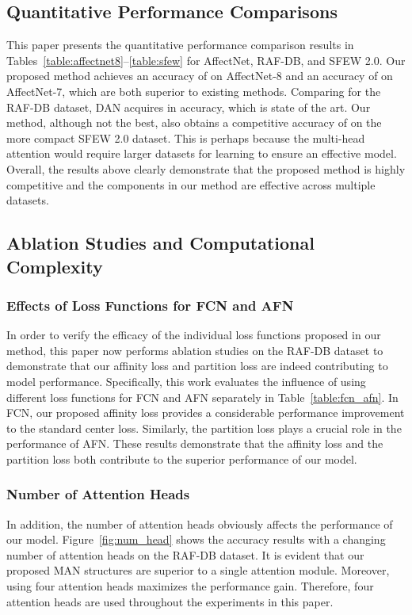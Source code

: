 \documentclass{article}
\begin{document}
\subsection{Quantitative Performance Comparisons}
This paper presents the quantitative performance comparison results in Tables~\ref{table:affectnet8}--\ref{table:sfew} for AffectNet, RAF-DB, and SFEW 2.0. Our proposed method achieves an accuracy of  on AffectNet-8 and an accuracy of  on AffectNet-7, which are both superior to existing methods. Comparing for the RAF-DB dataset, DAN acquires  in accuracy, which is state of the art. Our method, although not the best, also obtains a competitive accuracy of  on the more compact SFEW 2.0 dataset. This is perhaps because the multi-head attention would require larger datasets for learning to ensure an effective model. Overall, the results above clearly demonstrate that the proposed method is highly competitive and the components in our method are effective across multiple datasets.

\subsection{Ablation Studies and Computational Complexity}

\subsubsection{Effects of Loss Functions for FCN and AFN}
In order to verify the efficacy of the individual loss functions proposed in our method, this paper now performs ablation studies on the RAF-DB dataset to demonstrate that our affinity loss and partition loss are indeed contributing to model performance. Specifically, this work evaluates the influence of using different loss functions for FCN and AFN separately in Table~\ref{table:fcn_afn}. In FCN, our proposed affinity loss provides a considerable performance improvement to the standard center loss. Similarly, the partition loss plays a crucial role in the performance of AFN. These results demonstrate that the affinity loss and the partition loss both contribute to the superior performance of our model.


\subsubsection{Number of Attention Heads}
 In addition, the number of attention heads obviously affects the performance of our model. Figure~\ref{fig:num_head} shows the accuracy results with a changing number of attention heads on the RAF-DB dataset. It is evident that our proposed MAN structures are superior to a single attention module. Moreover, using four attention heads maximizes the performance gain. Therefore, four attention heads are used throughout the experiments in this paper.
\end{document}
